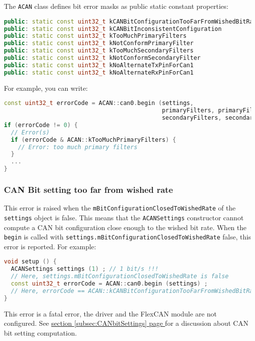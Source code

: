 \documentclass[10pt, a4paper, obeyspaces, openany]{extarticle}
\newcommand\refSubsectionPage[1]{\hyperref[subsec:#1]{section \ref*{subsec:#1} page \pageref{subsec:#1}}}
\newcommand \subsubsectionLabel[2]{\subsubsection{#1}\label{subsubsec:#2}}
\begin{document}
The \texttt{ACAN} class defines bit error masks as public static constant properties: 
{ \small\begin{lstlisting}[language=c++]
public: static const uint32_t kCANBitConfigurationTooFarFromWishedBitRate = 1 << 0 ;
public: static const uint32_t kCANBitInconsistentConfiguration            = 1 << 1 ;
public: static const uint32_t kTooMuchPrimaryFilters                      = 1 << 2 ;
public: static const uint32_t kNotConformPrimaryFilter                    = 1 << 3 ;
public: static const uint32_t kTooMuchSecondaryFilters                    = 1 << 4 ;
public: static const uint32_t kNotConformSecondaryFilter                  = 1 << 5 ;
public: static const uint32_t kNoAlternateTxPinForCan1                    = 1 << 6 ;
public: static const uint32_t kNoAlternateRxPinForCan1                    = 1 << 7 ;
\end{lstlisting}}

For example, you can write:
{ \small\begin{lstlisting}[language=c++]
const uint32_t errorCode = ACAN::can0.begin (settings,
                                             primaryFilters, primaryFilterCount,
                                             secondaryFilters, secondaryFilterCount) ;
if (errorCode != 0) {
  // Error(s)
  if (errorCode & ACAN::kTooMuchPrimaryFilters) {
    // Error: too much primary filters
  }
  ...
}
\end{lstlisting}}

\subsubsectionLabel{CAN Bit setting too far from wished rate}{CANBitTooFarError}

This error is raised when the \texttt{mBitConfigurationClosedToWishedRate} of the \texttt{settings} object is false. This means that the \texttt{ACANSettings} constructor cannot compute a CAN bit configuration close enough to the wished bit rate. When the \texttt{begin} is called with \texttt{settings.mBitConfigurationClosedToWishedRate} false, this error is reported. For example:

{ \small\begin{lstlisting}[language=c++]
void setup () {
  ACANSettings settings (1) ; // 1 bit/s !!!
  // Here, settings.mBitConfigurationClosedToWishedRate is false
  const uint32_t errorCode = ACAN::can0.begin (settings) ;
  // Here, errorCode == ACAN::kCANBitConfigurationTooFarFromWishedBitRateErrorMask
}
\end{lstlisting}}

This error is a fatal error, the driver and the FlexCAN module are not configured. See \refSubsectionPage{CANbitSettings} for a discussion about CAN bit setting computation.
\end{document}
